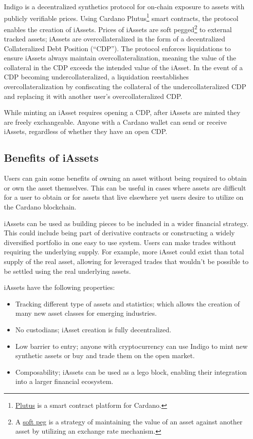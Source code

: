 \documentclass{article}
\begin{document}
\begin{sloppypar}
Indigo is a decentralized synthetics protocol for on-chain exposure to
assets with publicly verifiable prices. Using Cardano Plutus\footnote{\href{https://developers.cardano.org/docs/smart-contracts/plutus/}{Plutus}
  is a smart contract platform for Cardano.} smart contracts, the
protocol enables the creation of iAssets. Prices of iAssets are soft
pegged\footnote{A
  \href{https://coinmarketcap.com/alexandria/glossary/soft-peg}{soft
  peg} is a strategy of maintaining the value of an asset against
  another asset by utilizing an exchange rate mechanism.} to external
tracked assets; iAssets are overcollateralized in the form of a
decentralized Collateralized Debt Position (``CDP''). The protocol
enforces liquidations to ensure iAssets always maintain
overcollateralization, meaning the value of the collateral in the CDP
exceeds the intended value of the iAsset. In the event of a CDP becoming
undercollateralized, a liquidation reestablishes overcollateralization
by confiscating the collateral of the undercollateralized CDP and
replacing it with another user's overcollateralized CDP.

While minting an iAsset requires opening a CDP, after iAssets are minted
they are freely exchangeable. Anyone with a Cardano wallet can send or
receive iAssets, regardless of whether they have an open CDP.

\hypertarget{benefits-of-iassets}{%
\subsection{Benefits of iAssets}\label{benefits-of-iassets}}

Users can gain some benefits of owning an asset without being required
to obtain or own the asset themselves. This can be useful in cases where
assets are difficult for a user to obtain or for assets that live
elsewhere yet users desire to utilize on the Cardano blockchain.

iAssets can be used as building pieces to be included in a wider
financial strategy. This could include being part of derivative
contracts or constructing a widely diversified portfolio in one easy to
use system. Users can make trades without requiring the underlying
supply. For example, more iAsset could exist than total supply of the
real asset, allowing for leveraged trades that wouldn't be possible to
be settled using the real underlying assets.

iAssets have the following properties:

\begin{itemize}
\item
  Tracking different type of assets and statistics; which allows the
  creation of many new asset classes for emerging industries.
\item
  No custodians; iAsset creation is fully decentralized.
\item
  Low barrier to entry; anyone with cryptocurrency can use Indigo to
  mint new synthetic assets or buy and trade them on the open market.
\item
  Composability; iAssets can be used as a lego block, enabling their
  integration into a larger financial ecosystem.
\end{itemize}


\end{sloppypar}
\end{document}
